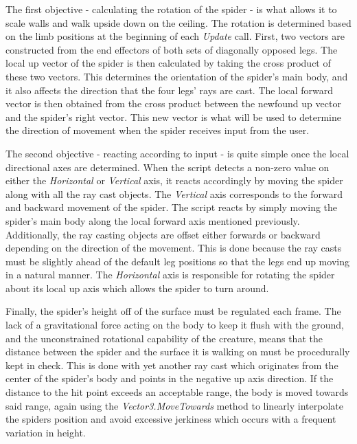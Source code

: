 The first objective - calculating the rotation of the spider - is what allows it
to scale walls and walk upside down on the ceiling. The rotation is determined
based on the limb positions at the beginning of each \textit{Update} call.
First, two vectors are constructed from the end effectors of both sets of
diagonally opposed legs. The local up vector of the spider is then calculated by
taking the cross product of these two vectors. This determines the orientation
of the spider's main body, and it also affects the direction that the four legs'
rays are cast. The local forward vector is then obtained from the cross product
between the newfound up vector and the spider's right vector. This new vector is
what will be used to determine the direction of movement when the spider
receives input from the user.

The second objective - reacting according to input - is quite simple once the
local directional axes are determined. When the script detects a non-zero value
on either the \textit{Horizontal} or \textit{Vertical} axis, it reacts
accordingly by moving the spider along with all the ray cast objects. The
\textit{Vertical} axis corresponds to the forward and backward movement of the
spider. The script reacts by simply moving the spider's main body along the
local forward axis mentioned previously. Additionally, the ray casting objects
are offset either forwards or backward depending on the direction of the
movement. This is done because the ray casts must be slightly ahead of the
default leg positions so that the legs end up moving in a natural manner.
The \textit{Horizontal} axis is responsible for rotating the spider about its
local up axis which allows the spider to turn around. 

Finally, the spider's height off of the surface must be regulated each frame.
The lack of a gravitational force acting on the body to keep it flush with the
ground, and the unconstrained rotational capability of the creature, means that
the distance between the spider and the surface it is walking on must be
procedurally kept in check. This is done with yet another ray cast which
originates from the center of the spider's body and points in the negative up
axis direction. If the distance to the hit point exceeds an acceptable range,
the body is moved towards said range, again using the
\textit{Vector3.MoveTowards} method to linearly interpolate the spiders position
and avoid excessive jerkiness which occurs with a frequent variation in height. 



